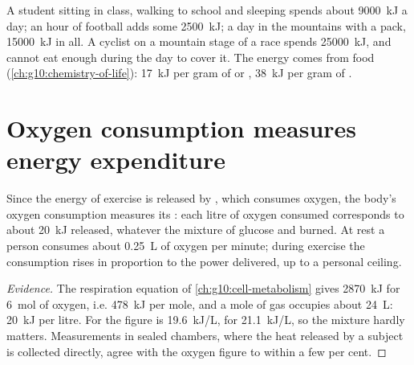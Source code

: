 \begin{example}\label{ex:g10:exercise-and-energy:budgets}
A student sitting in class, walking to school and sleeping spends
about \qty{9000}{kJ} a day; an hour of football adds some
\qty{2500}{kJ}; a day in the mountains with a pack, \qty{15000}{kJ} in
all. A cyclist on a mountain stage of a race spends \qty{25000}{kJ},
and cannot eat enough during the day to cover it. The energy comes
from food (\cref{ch:g10:chemistry-of-life}): \qty{17}{kJ} per gram of
 or , \qty{38}{kJ} per gram of .
\end{example}

\section{Oxygen consumption measures energy expenditure}

\begin{proposition}\label{prop:g10:exercise-and-energy:oxygen}
Since the energy of exercise is released by ,
which consumes oxygen, the body's oxygen consumption measures its
: each litre of oxygen consumed corresponds to
about \qty{20}{kJ} released, whatever the mixture of glucose and
 burned. At rest a person consumes about \qty{0.25}{L} of
oxygen per minute; during exercise the consumption rises in
proportion to the power delivered, up to a personal ceiling.
\end{proposition}
\begin{proof}[Evidence]
The respiration equation of \cref{ch:g10:cell-metabolism} gives
\qty{2870}{kJ} for \qty{6}{mol} of oxygen, i.e. \qty{478}{kJ} per mole,
and a mole of gas occupies about \qty{24}{L}: \qty{20}{kJ} per litre.
For  the figure is \qty{19.6}{kJ/L}, for 
\qty{21.1}{kJ/L}, so the mixture hardly matters. Measurements in
sealed chambers, where the heat released by a subject is collected
directly, agree with the oxygen figure to within a few per cent.
\end{proof}

